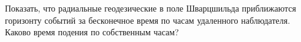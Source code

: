 \begin{tproblem}
  Показать, что радиальные геодезические в поле Шварцшильда
  приближаются горизонту событий за бесконечное время по часам
  удаленного наблюдателя. Каково время подения по собственным часам?
\end{tproblem}
